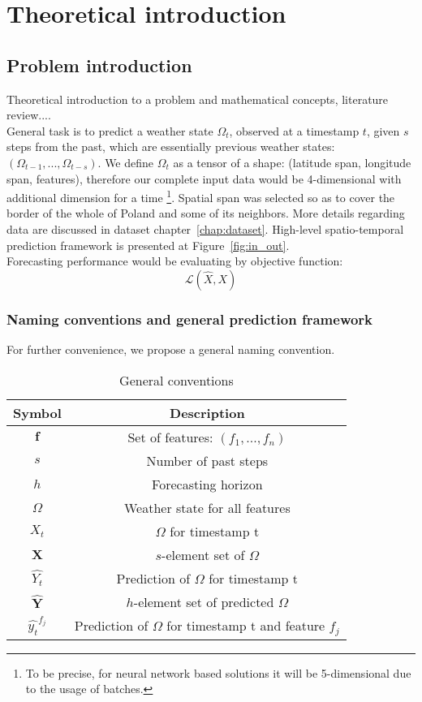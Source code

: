 \chapter{Theoretical introduction}
	
\section{Problem introduction}
 Theoretical introduction to a problem and mathematical concepts, literature review.... \\
 
\noindent General task is to predict a weather state $\Omega_t$, observed at a timestamp $t$, given $s$ steps from the past, which are essentially previous weather states: $(\Omega_{t-1}, ..., \Omega_{t-s})$. We define $\Omega_t$ as a tensor of a shape: (latitude span, longitude span, features), therefore our complete input data would be 4-dimensional with additional dimension for a time \footnote{To be precise, for neural network based solutions it will be 5-dimensional due to the usage of batches.}. Spatial span was selected so as to cover the border of the whole of Poland and some of its neighbors. More details regarding data are discussed in dataset chapter~\ref{chap:dataset}. High-level spatio-temporal prediction framework is presented at Figure~\ref{fig:in_out}. \\

\noindent Forecasting performance would be evaluating by objective function:
\[
    \mathcal{L}(\hat{X}, X)
\]


\newpage
\subsection{Naming conventions and general prediction framework}
 For further convenience, we propose a general naming convention. 
 \begin{table}[!h]
    \centering
     \begin{tabular}{|c|c|}
        \hline
        Symbol & Description \\
        \hline
        $\mathbf{f}$ & Set of features: $(f_1,..., f_n)$ \\
        $s$ & Number of past steps \\
        $h$ & Forecasting horizon \\
        $\Omega$ & Weather state for all features \\
        $X_t$ & $\Omega$ for timestamp t\\
        $\mathbf{X}$ & $s$-element set of $\Omega$  \\
        $\hat{Y_t}$ & Prediction of $\Omega$ for timestamp t \\
        $\mathbf{\hat{Y}}$ & $h$-element set of predicted $\Omega$ \\
        $\hat{y_t}^{f_j}$ & Prediction of $\Omega$ for timestamp t and feature $f_j$ \\
        \hline
    \end{tabular}
    \caption{General conventions}
 \end{table}
 
